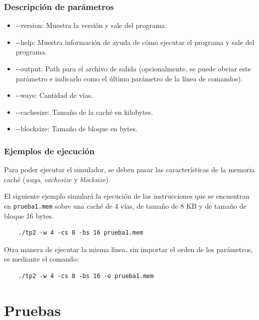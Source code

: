 \documentclass[titlepage,a4paper]{article}
\begin{document}
\subsubsection{Descripción de parámetros}
\begin{itemize}
    \cprotect\item[\verb|-V|] {-}{-}version: Muestra la versión y sale del programa.
    \cprotect\item[\verb|-h|] {-}{-}help: Muestra información de ayuda de cómo ejecutar el programa y sale del programa.
    \cprotect\item[\verb|-o|] {-}{-}output: Path para el archivo de salida (opcionalmente, se puede obviar este parámetro e indicarlo como el último parámetro de la línea de comandos).
    \cprotect\item[\verb|-w|] {-}{-}ways: Cantidad de vías.
    \cprotect\item[\verb|-cs|] {-}{-}cachesize: Tamaño de la caché en kilobytes.
    \cprotect\item[\verb|-bs|] {-}{-}blocksize: Tamaño de bloque en bytes.
\end{itemize}

\subsubsection{Ejemplos de ejecución}

Para poder ejecutar el simulador, se deben pasar las características de la memoria caché (\textit{ways}, \textit{cachesize} y \textit{blocksize}). 


El siguiente ejemplo simulará la ejecución de las instrucciones que se encuentran en \verb|prueba1.mem| sobre una caché de 4 vías, de tamaño de 8 KB y de tamaño de bloque 16 bytes.

\begin{verbatim}
    ./tp2 -w 4 -cs 8 -bs 16 prueba1.mem
\end{verbatim}

Otra manera de ejecutar la misma línea, sin importar el orden de los parámetros, es mediante el comando:
\begin{verbatim}
    ./tp2 -w 4 -cs 8 -bs 16 -o prueba1.mem
\end{verbatim}

\section{Pruebas}
\end{document}
